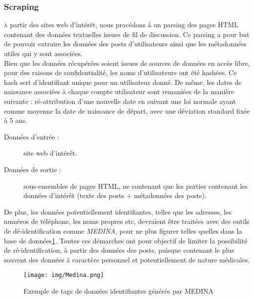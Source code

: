 \documentclass[a4paper, 12pt, openany, oneside, abstract=on]{article} %
\begin{document}
\subsubsection{Scraping}
\textsc{à} partir des sites web d'intérêt, nous procédons à un parsing des pages HTML contenant des données textuelles issues de fil de discussion. Ce parsing a pour but de pouvoir extraire les données des posts d'utilisateurs ainsi que les métadonnées utiles qui y sont associées.\\
Bien que les données récupérées soient issues de sources de données en accès libre, pour des raisons de confidentialité, les noms d'utilisateurs ont été hashées. Ce hash sert d'identifiant unique pour un utilisateur donné. De même, les dates de naissance associées à chaque compte utilisateur sont remaniées de la manière suivante : ré-attribution d'une nouvelle date en suivant une loi normale ayant comme moyenne la date de naissance de départ, avec une déviation standard fixée à 5 ans. 
\begin{description}
    \item[Données d'entrée :] site web d'intérêt.
    \item[Données de sortie :] sous-ensembles de pages HTML, ne contenant que les parties contenant les données d'intérêt (texte des posts + métadonnées des posts).
\end{description}

De plus, les données potentiellement identifiantes, telles que les adresses, les numéros de téléphone, les noms propres etc, devraient être traitées avec des outils de dé-identification comme \emph{MEDINA}\cite{Grouin2013, Grouin2014a, Grouin2014}, pour ne plus figurer telles quelles dans la base de données\ref{fig:MEDINA}. Toutes ces démarches ont pour objectif de limiter la possibilité de ré-identification, à partir des données des posts, puisque contenant le plus souvent des données à caractère personnel et potentiellement de nature médicales.
\begin{figure}[H]
    \centering
    \texttt{[image: img/Medina.png]}
    \caption{\label{fig:MEDINA}Exemple de tags de données identifiantes générés par MEDINA}
\end{figure}
\end{document}
